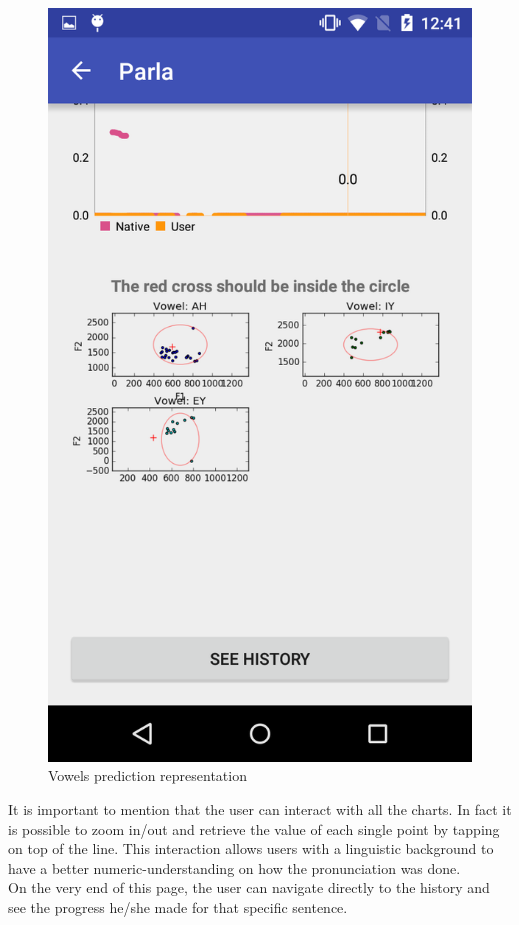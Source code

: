 \begin{figure}[!ht]
\begin{minipage}{.5\textwidth}
		\includegraphics[scale=0.18]{Figures/screenshots/vowels.png}
		\caption{Vowels prediction representation}
		\label{fig:vowels_page}
	\end{minipage}
\end{figure}


\noindent It is important to mention that the user can interact with all the charts. In fact it is possible to zoom in/out and retrieve the value of each single point by tapping on top of the line. This interaction allows users with a linguistic background to have a better numeric-understanding on how the pronunciation was done. \\
\noindent On the very end of this page, the user can navigate directly to the history and see the progress he/she made for that specific sentence.

